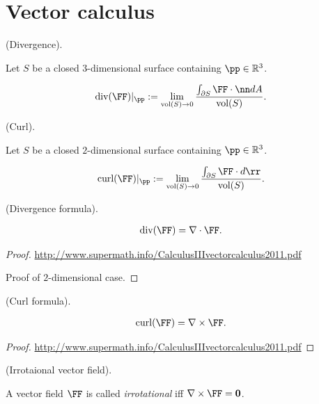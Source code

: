 \section*{Vector calculus}

\begin{defn}
    (Divergence).

    Let $S$ be a closed $3$-dimensional surface containing $\pp \in \R^3$.

    \begin{align*}
        \div(\FF)|_\pp := \lim_{\text{vol}(S) \rightarrow 0} \frac{\int_{\pd S} \FF \cdot \nn dA}{\text{vol}(S)}.
    \end{align*}
\end{defn}

\begin{defn}
    (Curl).

    Let $S$ be a closed $2$-dimensional surface containing $\pp \in \R^3$.

    \begin{align*}
        \text{curl}(\FF)|_\pp := \lim_{\text{vol}(S) \rightarrow 0} \frac{\int_{\pd S}\FF \cdot d\rr}{\text{vol}(S)}.
    \end{align*}
\end{defn}

\begin{theorem}
    (Divergence formula).

    \begin{align*}
        \text{div}(\FF) = \nabla \cdot \FF.
    \end{align*}
\end{theorem}

\begin{proof}
    \url{http://www.supermath.info/CalculusIIIvectorcalculus2011.pdf}

    Proof of $2$-dimensional case.
\end{proof}

\begin{theorem}
    (Curl formula).

    \begin{align*}
        \text{curl}(\FF) = \nabla \times \FF.
    \end{align*}
\end{theorem}

\begin{proof}
    \url{http://www.supermath.info/CalculusIIIvectorcalculus2011.pdf}
\end{proof}

\begin{defn}
    (Irrotaional vector field).
    
    A vector field $\FF$ is called \textit{irrotational} iff $\nabla \times \FF = \mathbf{0}$.
\end{defn}

